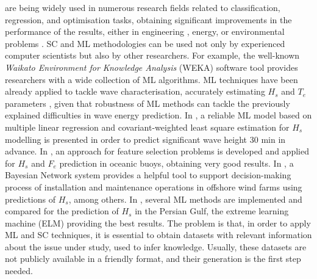 \documentclass[energies,article,accept,moreauthors,pdftex]{Definitions/mdpi}
\begin{document}
		 are being widely used in numerous research fields related to classification, regression, and optimisation tasks, obtaining significant improvements in the performance of the results, either in engineering \cite{Alizadeh2020}, energy, or environmental problems \cite{Fi-John2019,Mosavi2019,GUO201816}. SC and ML methodologies can be used not only by experienced computer scientists but also by other researchers. For example, the well-known \textit{Waikato Environment for Knowledge Analysis} (WEKA) \cite{WEKA} software tool provides researchers with a wide collection of ML algorithms. ML techniques have been already applied to tackle wave characterisation, accurately estimating $H_{s}$ and $T_{e}$ parameters \cite{DURANROSAL2017268, KUMAR2017605}, given that robustness of ML methods can tackle the previously explained difficulties in wave energy prediction. In \cite{Ali2020}, a reliable ML model based on multiple linear regression and covariant-weighted least square estimation for $H_s$ modelling is presented in order to predict significant wave height 30 min in advance. In \cite{Cornejo-Bueno2016}, an approach for feature selection problems is developed and applied for $H_s$ and $F_e$ prediction in oceanic buoys, obtaining very good results. In \cite{Emmanouil2020}, a Bayesian Network system provides a helpful tool to support decision-making process of installation and maintenance operations in offshore wind farms using predictions of $H_s$, among others. In \cite{Shamshirband2020}, several ML methods are implemented and compared for the prediction of $H_s$ in the Persian Gulf, the extreme learning machine (ELM) providing the best results. The problem is that, in order to apply ML and SC techniques, it is essential to obtain datasets with relevant information about the issue under study, used to infer knowledge. Usually, these datasets are not publicly available in a friendly format, and their generation is the first step needed.
		
\end{document}
